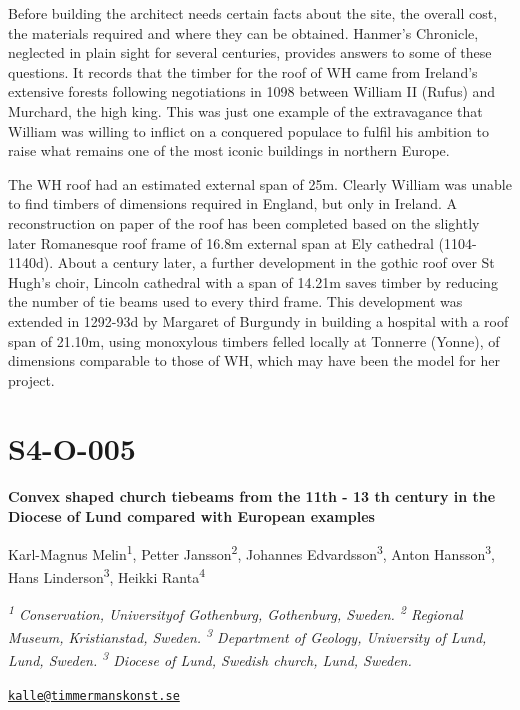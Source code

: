 \documentclass[
]{book}
\begin{document}
Before building the architect needs certain facts about the site, the overall cost, the materials required and where they can be obtained. Hanmer's Chronicle, neglected in plain sight for several centuries, provides answers to some of these questions. It records that the timber for the roof of WH came from Ireland's extensive forests following negotiations in 1098 between William II (Rufus) and Murchard, the high king. This was just one example of the extravagance that William was willing to inflict on a conquered populace to fulfil his ambition to raise what remains one of the most iconic buildings in northern Europe.

The WH roof had an estimated external span of 25m. Clearly William was unable to find timbers of dimensions required in England, but only in Ireland. A reconstruction on paper of the roof has been completed based on the slightly later Romanesque roof frame of 16.8m external span at Ely cathedral (1104-1140d). About a century later, a further development in the gothic roof over St Hugh's choir, Lincoln cathedral with a span of 14.21m saves timber by reducing the number of tie beams used to every third frame. This development was extended in 1292-93d by Margaret of Burgundy in building a hospital with a roof span of 21.10m, using monoxylous timbers felled locally at Tonnerre (Yonne), of dimensions comparable to those of WH, which may have been the model for her project.

\hypertarget{s4-o-005}{%
\section*{S4-O-005}\label{s4-o-005}}

\textbf{Convex shaped church tiebeams from the 11th - 13 th century in the Diocese of Lund compared with European examples}

Karl-Magnus Melin\textsuperscript{1}, Petter Jansson\textsuperscript{2}, Johannes Edvardsson\textsuperscript{3}, Anton Hansson\textsuperscript{3}, Hans Linderson\textsuperscript{3}, Heikki Ranta\textsuperscript{4}

\emph{\textsuperscript{1} Conservation, Universityof Gothenburg, Gothenburg, Sweden. \textsuperscript{2} Regional Museum, Kristianstad, Sweden. \textsuperscript{3} Department of Geology, University of Lund, Lund, Sweden. \textsuperscript{3} Diocese of Lund, Swedish church, Lund, Sweden.}

\href{mailto:kalle@timmermanskonst.se}{\nolinkurl{kalle@timmermanskonst.se}}
\end{document}
